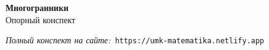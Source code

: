 \documentclass{umk-matematika}
\begin{document}
\begin{center}
{\Large\bfseries Многогранники}
\\[0.3cm]{\large Опорный конспект}
\end{center}
\vspace{0.5cm}

\begin{center}
\textit{Полный конспект на сайте:}\
\texttt{https://umk-matematika.netlify.app}
\end{center}
\end{document}
